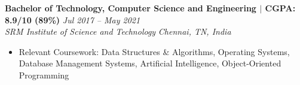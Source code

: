 \documentclass[10pt, letterpaper]{article}
\newcommand{\resumeItem}[1]{\item\small{#1}}
\newcommand{\resumeSubheading}[4]{
  \textbf{#1} \hfill \textit{\small #2} \\
  \textit{\small #3} \hfill \textit{\small #4}
}
\begin{document}
\vspace{3pt}

\resumeSubheading{Bachelor of Technology, Computer Science and Engineering $|$ CGPA: 8.9/10 (89\%)}{Jul 2017 -- May 2021}{SRM Institute of Science and Technology}{Chennai, TN, India}
\begin{itemize}[leftmargin=1.5em, itemsep=0pt, topsep=2pt]
  \resumeItem{Relevant Coursework: Data Structures \& Algorithms, Operating Systems, Database Management Systems, Artificial Intelligence, Object-Oriented Programming}
\end{itemize}
\end{document}
